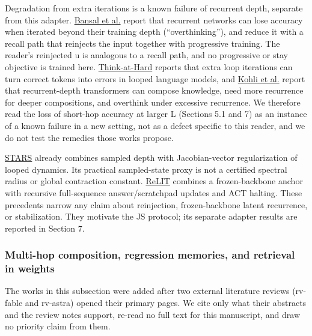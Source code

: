 Degradation from extra iterations is a known failure of recurrent depth, separate from this
adapter. \href{https://arxiv.org/abs/2202.05826}{Bansal et al.} report that recurrent networks can
lose accuracy when iterated beyond their training depth (“overthinking”), and reduce it with a
recall path that reinjects the input together with progressive training. The reader’s
reinjected u is analogous to a recall path, and no progressive or stay objective is trained
here. \href{https://arxiv.org/abs/2511.08577}{Think-at-Hard} reports that extra loop iterations can
turn correct tokens into errors in looped language models, and
\href{https://arxiv.org/abs/2604.07822}{Kohli et al.} report that recurrent-depth transformers can
compose knowledge, need more recurrence for deeper compositions, and overthink under excessive
recurrence. We therefore read the loss of short-hop accuracy at larger L (Sections 5.1 and 7)
as an instance of a known failure in a new setting, not as a defect specific to this reader,
and we do not test the remedies those works propose.  %

\href{https://arxiv.org/html/2605.26733v1}{STARS} already combines sampled depth with
Jacobian-vector regularization of looped dynamics. Its practical sampled-state proxy
is not a certified spectral radius or global contraction constant.
\href{https://arxiv.org/html/2608.08113v1}{ReLIT} combines a frozen-backbone anchor with
recursive full-sequence answer/\allowbreak{}scratchpad updates and ACT halting. These precedents
narrow any claim about reinjection, frozen-backbone latent recurrence, or stabilization.
They motivate the JS protocol; its separate adapter results are
reported in Section 7.

\subsubsection*{Multi-hop composition, regression memories, and retrieval in weights}

The works in this subsection were added after two external literature reviews
(rv-fable and rv-astra)
opened their primary pages. We cite only what their abstracts and the review notes support,
re-read no full text for this manuscript, and draw no priority claim from them.

